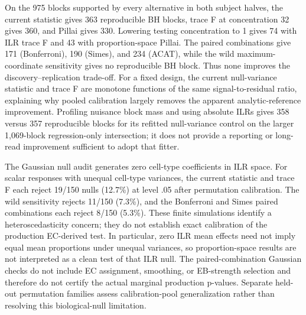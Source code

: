 \documentclass[11pt]{article}
\begin{document}
On the 975 blocks supported by every alternative in both subject halves, the current statistic gives 363 reproducible BH blocks, trace F at concentration 32 gives 360, and Pillai gives 330. Lowering testing concentration to 1 gives 74 with ILR trace F and 43 with proportion-space Pillai. The paired combinations give 171 (Bonferroni), 190 (Simes), and 234 (ACAT), while the wild maximum-coordinate sensitivity gives no reproducible BH block. Thus none improves the discovery--replication trade-off. For a fixed design, the current null-variance statistic and trace F are monotone functions of the same signal-to-residual ratio, explaining why pooled calibration largely removes the apparent analytic-reference improvement. Profiling nuisance block mass and using absolute ILRs gives 358 versus 357 reproducible blocks for its refitted null-variance control on the larger 1,069-block regression-only intersection; it does not provide a reporting or long-read improvement sufficient to adopt that fitter.

The Gaussian null audit generates zero cell-type coefficients in ILR space. For scalar responses with unequal cell-type variances, the current statistic and trace F each reject 19/150 nulls (12.7\%) at level .05 after permutation calibration. The wild sensitivity rejects 11/150 (7.3\%), and the Bonferroni and Simes paired combinations each reject 8/150 (5.3\%). These finite simulations identify a heteroscedasticity concern; they do not establish exact calibration of the production EC-derived test. In particular, zero ILR mean effects need not imply equal mean proportions under unequal variances, so proportion-space results are not interpreted as a clean test of that ILR null. The paired-combination Gaussian checks do not include EC assignment, smoothing, or EB-strength selection and therefore do not certify the actual marginal production p-values. Separate held-out permutation families assess calibration-pool generalization rather than resolving this biological-null limitation.
\end{document}
